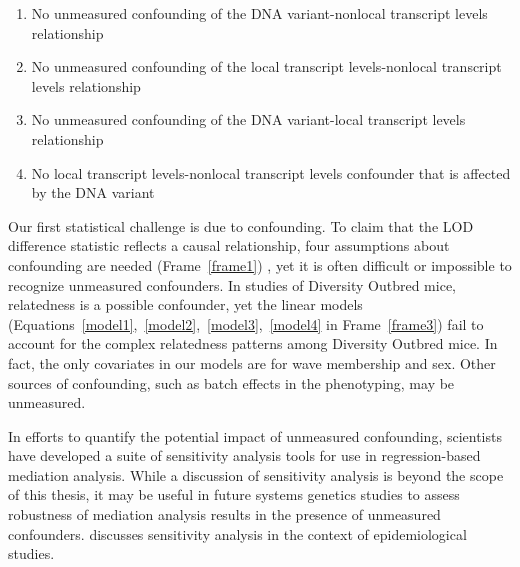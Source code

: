 \documentclass[oneside]{book}\usepackage[]{graphicx}\usepackage[]{color}
\newenvironment{frameenv}[1]
    {\begin{myfloat}[tb]
    \begin{mdframed}[roundcorner=10pt,backgroundcolor=blue!10]
    \caption{#1}
    }
    {%
    \end{mdframed}\end{myfloat}
    }
\begin{document}
\begin{frameenv}{Four assumptions for causal inference}\label{frame1}
  \begin{enumerate}
\item No unmeasured confounding of the DNA variant-nonlocal transcript levels relationship
\item No unmeasured confounding of the local transcript levels-nonlocal transcript levels relationship
\item No unmeasured confounding of the DNA variant-local transcript levels relationship
\item No local transcript levels-nonlocal transcript levels confounder that is affected by the DNA variant
\end{enumerate}

\end{frameenv}


Our first statistical challenge is due to confounding. To claim that the LOD difference statistic reflects a causal relationship, four assumptions about confounding are needed (Frame~\ref{frame1}) \citep{vanderweele2015explanation}, yet
it is often difficult or impossible to recognize unmeasured confounders. 
In studies of Diversity Outbred mice, relatedness is a possible confounder, 
yet the linear models (Equations~\ref{model1},~\ref{model2},~\ref{model3},~\ref{model4}
in Frame~\ref{frame3}) fail to account for the complex relatedness patterns 
among Diversity Outbred mice. 
In fact, the only covariates in our models are for wave membership and sex. 
Other sources of confounding, such as batch effects in the phenotyping, may be unmeasured.

In efforts to quantify the potential impact of unmeasured confounding, scientists have 
developed a suite of sensitivity analysis tools for use in regression-based mediation analysis.
While a discussion of sensitivity analysis is beyond the scope of this thesis, 
it may be useful in future systems genetics studies to assess robustness of mediation analysis
results in the presence of unmeasured confounders. 
\citet{vanderweele2015explanation} discusses sensitivity analysis in the context of epidemiological studies. 







\end{document}
